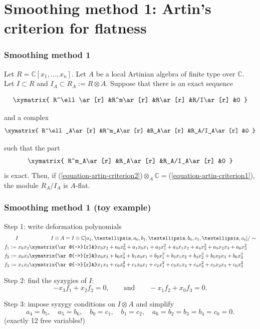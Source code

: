 \documentclass{beamer}
\begin{document}
\section{Smoothing method 1: Artin's criterion for flatness}
\label{section-artin}

\begin{frame}%
\frametitle{Smoothing method 1}

\begin{theorem}
\label{theorem-artin-criterion}
Let $R=\mathbb{C}[x_1,…,x_n]$.
Let $A$ be a local Artinian algebra of finite type over $\mathbb{C}$.
Let $I \subset R$ and $I_A \subset R_A:=R\otimes A$.
Suppose that there is an exact sequence

\begin{equation}
\label{equation-artin-criterion1}
\xymatrix{
R^\ell\ar[r]
&R^m\ar[r]
&R\ar[r]
&R/I\ar[r]
&0
}
\end{equation}

\noindent
and a complex
\begin{equation}
\label{equation-artin-criterion2}
\xymatrix{
R^\ell_A\ar[r]
&R^m_A\ar[r]
&R_A\ar[r]
&R_A/I_A\ar[r]
&0
}
\end{equation}

\noindent
such that the part
$$
\xymatrix{
R^m_A\ar[r]
&R_A\ar[r]
&R_A/I_A\ar[r]
&0
}
$$
is exact. 
Then, if
(\ref{equation-artin-criterion2})$\otimes_A\mathbb{C}
=$(\ref{equation-artin-criterion1}),
the module $R_A/I_A$ is $A$-flat.
\end{theorem}
\end{frame}

\begin{frame}%
\frametitle{Smoothing method 1 (toy example)}

{\color{blue}Step 1:} write deformation polynomials
\begin{align*}
I\qquad &\qquad \qquad I \otimes A
= I \otimes \mathbb{C}[a_1,…, a_6,b_1,…,b_6,c_1,…,c_6]/\sim
\\
\hspace{-0.5em}f_1:=x_0x_2&\xymatrix{\ar@{~>}[r]&}
x_0x_2+a_0x_0^2+a_1x_0x_1+a_2x_1^2+a_3x_1x_2+a_4x_2^2+a_5x_2x_3+a_6x_3^2\\
f_2:=x_0x_3&\xymatrix{\ar@{~>}[r]&}
x_0x_3+b_0x_0^2+b_1x_0x_1+b_2x_1^2+b_3x_1x_2+b_4x_2^2+b_5x_2x_3+b_6x_3^2\\
f_3:=x_1x_3&\xymatrix{\ar@{~>}[r]&}
x_1x_3+c_0x_0^2+c_1x_0x_1+c_2x_1^2+c_3x_1x_2+c_4x_2^2+c_5x_2x_3+c_6x_3^2
\end{align*}

\pause\noindent
{\color{blue}Step 2:} find the syzygies of $I$:
$$
-x_3 f_1+x_2f_2=0,\qquad  \text{and}\qquad 
-x_1f_2+x_0f_3=0.
$$


\pause\medskip\noindent
{\color{blue}Step 3:} impose syzygy conditions on $I\otimes A$
and simplify
$$
a_4=b_5,\quad  a_5=b_6,
\quad b_0=c_1, \quad  b_1=c_2,
\quad a_6=b_2=b_3=b_4=c_0=0.
$$
(exactly 12 free variables!)
\end{frame}
\end{document}
